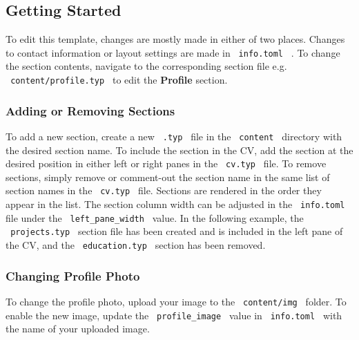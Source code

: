 \subsection{Getting Started}\label{getting-started}

To edit this template, changes are mostly made in either of two places.
Changes to contact information or layout settings are made in
\texttt{\ info.toml\ } . To change the section contents, navigate to the
corresponding section file e.g. \texttt{\ content/profile.typ\ } to edit
the \textbf{Profile} section.

\subsubsection{Adding or Removing
Sections}\label{adding-or-removing-sections}

To add a new section, create a new \texttt{\ .typ\ } file in the
\texttt{\ content\ } directory with the desired section name. To include
the section in the CV, add the section at the desired position in either
left or right panes in the \texttt{\ cv.typ\ } file. To remove sections,
simply remove or comment-out the section name in the same list of
section names in the \texttt{\ cv.typ\ } file. Sections are rendered in
the order they appear in the list. The section column width can be
adjusted in the \texttt{\ info.toml\ } file under the
\texttt{\ left\_pane\_width\ } value. In the following example, the
\texttt{\ projects.typ\ } section file has been created and is included
in the left pane of the CV, and the \texttt{\ education.typ\ } section
has been removed.

\begin{Shaded}
\begin{Highlighting}[]
\OperatorTok{{-}}\OperatorTok{=}\NormalTok{ (}
  \OperatorTok{,}
  \OperatorTok{,}
  \OperatorTok{,}
\NormalTok{)}
\end{Highlighting}
\end{Shaded}

\subsubsection{Changing Profile Photo}\label{changing-profile-photo}

To change the profile photo, upload your image to the
\texttt{\ content/img\ } folder. To enable the new image, update the
\texttt{\ profile\_image\ } value in \texttt{\ info.toml\ } with the
name of your uploaded image.

